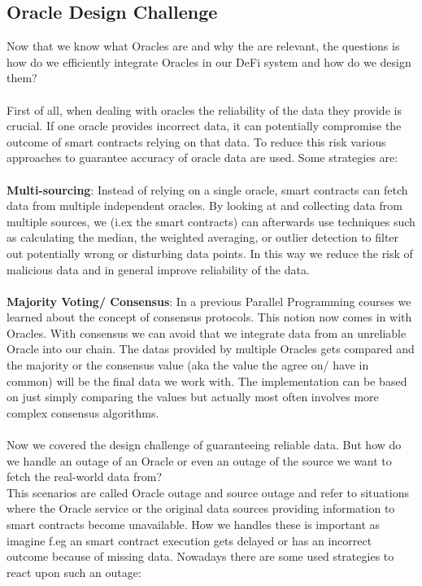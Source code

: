 \documentclass{article}
\begin{document}
\subsection{Oracle Design Challenge}
Now that we know what Oracles are and why the are relevant, the questions is how do we efficiently integrate Oracles in our DeFi system and how do we design them?\\
\\
First of all, when dealing with oracles the reliability of the data they provide is crucial. If one oracle provides incorrect data, it can potentially compromise the outcome of smart contracts relying on that data. To reduce this risk various approaches to guarantee accuracy of oracle data are used. Some strategies are:\\
\\
\textbf{Multi-sourcing}: Instead of relying on a single oracle, smart contracts can fetch data from multiple independent oracles. By looking at and collecting data from multiple sources, we (i.ex the smart contracts) can afterwards use techniques such as calculating the median, the weighted averaging, or outlier detection to filter out potentially wrong or disturbing data points. In this way we reduce the risk of malicious data  and in general improve reliability of the data.\\
\\
\textbf{Majority Voting/ Consensus}: In a previous Parallel Programming courses we learned about the concept of consensus protocols. This notion now comes in with Oracles. With consensus we can avoid that we integrate data from an unreliable Oracle into our chain. The datas provided by multiple Oracles gets compared and the majority or the consensus value (aka the value the agree on/ have in common) will be the final data we work with.  The implementation can be based on just simply comparing the values but actually most often involves more complex consensus algorithms.\\
\\
Now we covered the design challenge of guaranteeing reliable data. But how do we handle an outage of an Oracle or even an outage of the source we want to fetch the real-world data from?
\\
This scenarios are called Oracle outage and source outage and refer to situations where the Oracle service or the original data sources providing information to smart contracts become unavailable. How we handles these is important as imagine f.eg an smart contract execution gets delayed or has an incorrect outcome because of missing data. Nowadays there are some used strategies to react upon such an outage:\\
\end{document}
